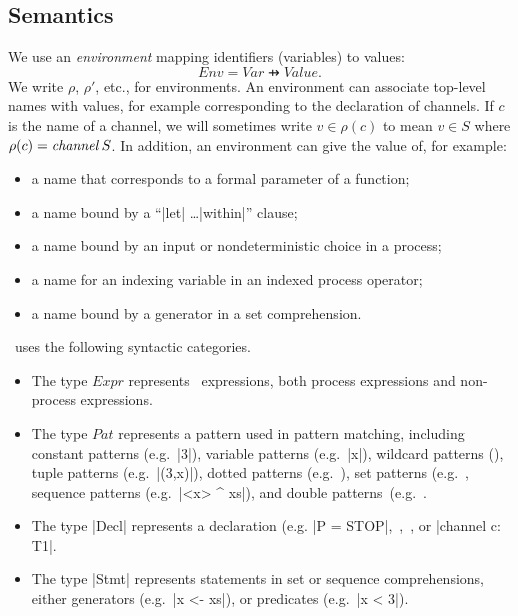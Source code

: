 \subsection{Semantics}

We use an \emph{environment} mapping identifiers (variables) to values:
\[
Env = Var \pfun Value.
\]
We write $\rho$, $\rho'$, etc., for environments.  An environment can
associate top-level names with values, for example corresponding to the
declaration of channels.  If $c$ is the name of a channel, we will sometimes
write $v \in \rho(c)$ to mean $v \in S$ where $\rho(c) = \mathop{\it channel} S$.
In addition, an environment can give the value of, for example:
%
\begin{itemize}
\item a name that corresponds to a formal parameter of a function;
\item a name bound by a ``|let| \ldots |within|'' clause;
\item a name bound by an input or nondeterministic choice in a process;
\item a name for an indexing variable in an indexed process operator;
\item a name bound by a generator in a set comprehension.
\end{itemize}

\CSPm\ uses the following syntactic categories.
%
\begin{itemize}
\item The type $Expr$ represents \CSPm\ expressions, both process expressions
  and non-process expressions.

\item The type $Pat$ represents a pattern used in pattern matching, including
  constant patterns (e.g.~|3|), variable patterns (e.g.~|x|), wildcard
  patterns (\CSPM{\_}), tuple patterns (e.g.~|(3,x)|), dotted patterns
  (e.g.~), set patterns (e.g.~, sequence patterns
  (e.g.~|<x> ^ xs|), and double patterns~(e.g.~.

\item The type |Decl| represents a declaration (e.g. |P = STOP|,\, ,\, , or |channel c: T1|.

\item The type |Stmt| represents statements in set or sequence comprehensions,
  either generators (e.g.~|x <- xs|), or predicates (e.g.~|x < 3|).
\end{itemize}


